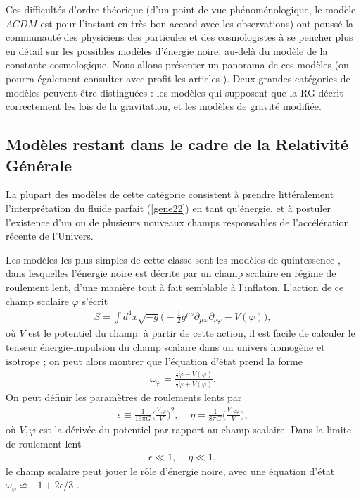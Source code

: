 \documentclass[a4paper,12pt]{report}
\theoremstyle{plain}
\theoremstyle{plain}
\begin{document}
Ces difficult\'es d'ordre th\'eorique (d'un point de vue ph\'enom\'enologique, le mod\`ele $ \Lambda CDM $
est pour l'instant en tr\`es bon accord avec les observations) ont pouss\'e la communaut\'e des
physiciens des particules et des cosmologistes \`a se pencher plus en d\'etail sur les possibles
mod\`eles d'\'energie noire, au-del\`a du mod\`ele de la constante cosmologique. Nous allons 
pr\'esenter un panorama de ces mod\`eles (on pourra \'egalement consulter avec profit les articles
\cite{75, 211, 265}). Deux grandes cat\'egories de mod\`eles peuvent \^etre distingu\'ees : les mod\`eles
qui supposent que la RG d\'ecrit correctement les lois de la gravitation, et les mod\`eles de
gravit\'e modifi\'ee.

\subsection{Mod\`eles restant dans le cadre de la Relativit\'e G\'en\'erale}
La plupart des mod\`eles de cette cat\'egorie consistent \`a prendre litt\'eralement 
l'interpr\'etation du fluide parfait (\ref{gene22}) en tant qu'\'energie, et \`a postuler l'existence d'un ou de
plusieurs nouveaux champs responsables de l'acc\'el\'eration r\'ecente de l'Univers.

Les mod\`eles les plus simples de cette classe sont les mod\`eles de quintessence \cite{221, 284},
dans lesquelles l'\'energie noire est d\'ecrite par un champ scalaire en r\'egime de roulement
lent, d'une mani\`ere tout \`a fait semblable \`a l'inflaton. L'action de ce champ scalaire $ \varphi $ s'\'ecrit
\begin{eqnarray}
 S = \int d^4x\sqrt{-g} \Biggl( -\frac{1}{2}g^{ \mu \nu} \partial_{\mu \varphi} \partial_{ \nu \varphi} - V(\varphi) \Biggr), \label{gene39}
\end{eqnarray}
o\`u $V$ est le potentiel du champ. \`a partir de cette action, il est facile de calculer le tenseur
\'energie-impulsion du champ scalaire dans un univers homog\`ene et isotrope ; on peut alors
montrer que l'\'equation d'\'etat prend la forme
\begin{eqnarray}
 \omega_\varphi = \frac{\frac{1}{2}\dot{\varphi} - V(\varphi) }{\frac{1}{2}\dot{\varphi} + V(\varphi) }. \label{gene40}
\end{eqnarray}
On peut d\'efinir les param\`etres de roulements lents par
\begin{eqnarray}
 \epsilon \equiv  \frac{1}{16 \pi G} \Biggl( \frac{V_{, \varphi}}{V}  \Biggr)^2, \;\;\;\;
 \eta = \frac{1}{ 8 \pi G} \Biggl(  \frac{V_{,\varphi \varphi}}{ V}    \Biggr), \label{gene41}
\end{eqnarray}
o\`u $ V{,\varphi}$ est la d\'eriv\'ee du potentiel par rapport au champ scalaire. Dans la limite de roulement
lent
\begin{eqnarray}
 \epsilon \ll 1, \;\;\;\; \eta \ll 1, \label{bene42}
\end{eqnarray}
le champ scalaire peut jouer le r\^ole d'\'energie noire, avec une \'equation d'\'etat  $ \omega_\varphi \backsimeq -1 + 2 \epsilon / 3 $ .
\end{document}
